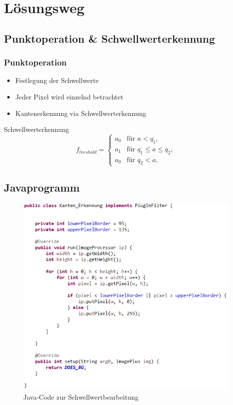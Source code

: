 \documentclass[12pt]{beamer}
\begin{document}
\section{Lösungsweg}
\subsection{Punktoperation \& Schwellwerterkennung}

\begin{frame}
\frametitle{Punktoperation}
\begin{itemize}
	\item Festlegung der Schwellwerte
	\item Jeder Pixel wird einzelnd betrachtet
	\item Kantenerkennung via Schwellwerterkennung
\end{itemize}
\begin{block}{Schwellwerterkennung}	
	\begin{equation*}
		f_{treshold}=
		\begin{cases}
			a_0   			& \text{für } a < q_1,\\
			a_1        		& \text{für } q_1 \leq a \leq q_2, \\
			a_0        		& \text{für } q_2 < a,
		\end{cases}
	\end{equation*}
\end{block}
\end{frame}
\subsection{Javaprogramm}
\begin{frame}
	\begin{figure}[H]
		\centering
		\includegraphics[width=.6\linewidth]{Code.png}
		\caption{Java-Code zur Schwellwertbearbeitung}
	\end{figure}
\end{frame}
\end{document}

